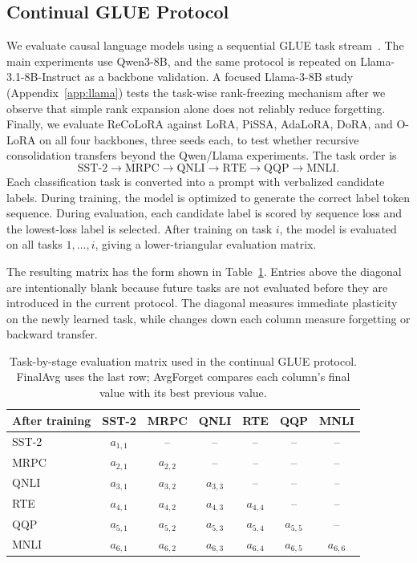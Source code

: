 \documentclass[11pt]{article}
\begin{document}
\subsection{Continual GLUE Protocol}
We evaluate causal language models using a sequential GLUE task stream~\cite{wang2019glue}. The main experiments use Qwen3-8B, and the same protocol is repeated on Llama-3.1-8B-Instruct as a backbone validation. A focused Llama-3-8B study (Appendix~\ref{app:llama}) tests the task-wise rank-freezing mechanism after we observe that simple rank expansion alone does not reliably reduce forgetting. Finally, we evaluate ReCoLoRA against LoRA, PiSSA, AdaLoRA, DoRA, and O-LoRA on all four backbones, three seeds each, to test whether recursive consolidation transfers beyond the Qwen/Llama experiments. The task order is
\begin{equation}
    \mathrm{SST\mbox{-}2} \rightarrow \mathrm{MRPC} \rightarrow \mathrm{QNLI} \rightarrow \mathrm{RTE} \rightarrow \mathrm{QQP} \rightarrow \mathrm{MNLI}.
\end{equation}
Each classification task is converted into a prompt with verbalized candidate labels. During training, the model is optimized to generate the correct label token sequence. During evaluation, each candidate label is scored by sequence loss and the lowest-loss label is selected. After training on task $i$, the model is evaluated on all tasks $1,\ldots,i$, giving a lower-triangular evaluation matrix.

The resulting matrix has the form shown in Table~\ref{tab:eval-matrix}. Entries above the diagonal are intentionally blank because future tasks are not evaluated before they are introduced in the current protocol. The diagonal measures immediate plasticity on the newly learned task, while changes down each column measure forgetting or backward transfer.

\begin{table}[t]
\centering
\begin{tabular}{lcccccc}
\toprule
After training & SST-2 & MRPC & QNLI & RTE & QQP & MNLI \\
\midrule
SST-2 & $a_{1,1}$ & -- & -- & -- & -- & -- \\
MRPC & $a_{2,1}$ & $a_{2,2}$ & -- & -- & -- & -- \\
QNLI & $a_{3,1}$ & $a_{3,2}$ & $a_{3,3}$ & -- & -- & -- \\
RTE & $a_{4,1}$ & $a_{4,2}$ & $a_{4,3}$ & $a_{4,4}$ & -- & -- \\
QQP & $a_{5,1}$ & $a_{5,2}$ & $a_{5,3}$ & $a_{5,4}$ & $a_{5,5}$ & -- \\
MNLI & $a_{6,1}$ & $a_{6,2}$ & $a_{6,3}$ & $a_{6,4}$ & $a_{6,5}$ & $a_{6,6}$ \\
\bottomrule
\end{tabular}
\caption{Task-by-stage evaluation matrix used in the continual GLUE protocol. FinalAvg uses the last row; AvgForget compares each column's final value with its best previous value.}
\label{tab:eval-matrix}
\end{table}
\end{document}
